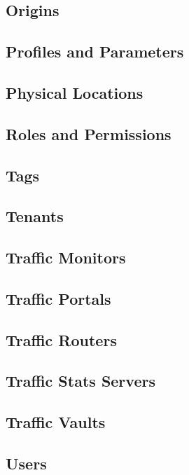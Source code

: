 \documentclass{article}
\begin{document}
\subsection{Origins}

\subsection{Profiles and Parameters}

\subsection{Physical Locations}

\subsection{Roles and Permissions\label{sec:roles-and-perms}}

\subsection{Tags}

\subsection{Tenants}

\subsection{Traffic Monitors}

\subsection{Traffic Portals}

\subsection{Traffic Routers}

\subsection{Traffic Stats Servers}

\subsection{Traffic Vaults}

\subsection{Users\label{sec:users}}
\end{document}
